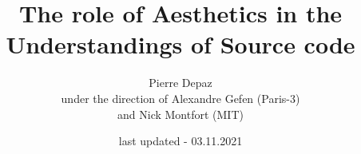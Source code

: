 \documentclass{book}
\begin{document}
\title{The role of Aesthetics in the Understandings of Source code}
\author{Pierre Depaz\\under the direction of Alexandre Gefen (Paris-3)\\and Nick Montfort (MIT)}
\date{last updated - 03.11.2021}
\maketitle



\pagebreak






\end{document}
